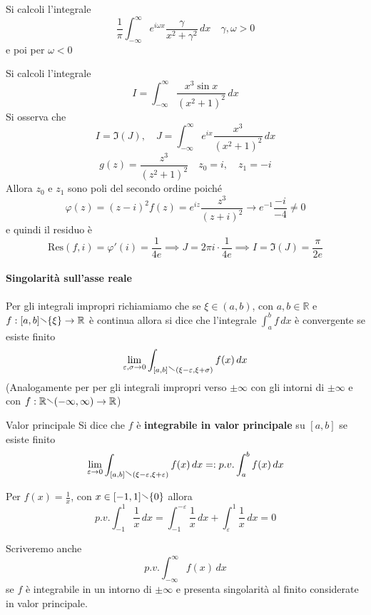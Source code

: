\begin{eser}
    Si calcoli l'integrale
    \[
      \frac{1}{\pi} \int_{-\infty}^{\infty} e^{i\omega x} \frac{\gamma}{x^2 +
      \gamma^2} \,dx \quad \gamma, \omega > 0 
    \]
    e poi per \(\omega < 0\) 
\end{eser}

\begin{eser}
    Si calcoli l'integrale
    \[
      I = \int_{-\infty}^{\infty} \frac{x^3\sin x}{{(x^2 + 1)}^2} \,dx 
    \]
    Si osserva che
    \[
        I = \Im {(J)}, \quad J = \int_{-\infty}^{\infty} e^{ix}
      \frac{x^3}{{(x^2+1)}^2} \,dx 
    \]
    \[
    g{(z)} = \frac{z^3}{{(z^2+1)}^2}\quad z_{0} = i, \quad z_{1} = -i
    \]
    Allora \(z_{0}\) e \(z_{1}\) sono poli del secondo ordine poiché
    \[
        \varphi {(z)} = {(z-i)}^2 f{(z)} = e^{iz} \frac{z^3}{{(z+i)}^2} \to
        e^{-1}\frac{-i}{-4}\neq 0
    \]
    e quindi il residuo è
    \[
      \mathrm{Res}{(f,i)} = \varphi '{(i)} = \frac{1}{4e} \implies J = 2\pi i
      \cdot \frac{1}{4e} \implies I = \Im(J) = \frac{\pi}{2e}
    \]
\end{eser}

\paragraph{Singolarità sull'asse reale} 
Per gli integrali impropri richiamiamo che se \(\xi \in {(a, b)}\), con \(a, b
\in \mathbb{R}\) e \(f : [a, b] \sminus \{\xi\} \to \mathbb{R}\) è continua
allora si dice che l'integrale \(\int_{a}^{b} f \,dx \) è convergente se esiste
finito
\[
    \lim_{\varepsilon, \sigma \to 0} \int _{[a, b] \sminus {(\xi - \varepsilon,
    \xi + \sigma)}} f{(x)} \,dx
\]
(Analogamente per per gli integrali impropri verso \(\pm \infty\) con gli intorni
di \(\pm \infty\) e con \(f : \mathbb{R} \sminus {(-\infty, \infty)} \to
\mathbb{R}\))

\begin{definition}{Valor principale}
    Si dice che \(f\) è \textbf{integrabile in valor principale} su \([a,b]\) se
    esiste finito
    \[
        \lim_{\varepsilon \to 0} \int _{[a,b] \sminus {(\xi - \varepsilon,
        \xi+\varepsilon)}} f{(x)} \,dx =: p.v. \int_{a}^{b} f{(x)} \,dx
    \]
\end{definition}
\begin{example}
    Per \(f{(x)} = \frac{1}{x}\), con \(x \in [-1, 1] \sminus \{0\} \) allora
    \[
      p.v. \int_{-1}^{1} \frac{1}{x} \,d x = \int_{-1}^{-\varepsilon}
      \frac{1}{x} \,dx + \int_{\varepsilon}^{1} \frac{1}{x} \,dx = 0 
    \]
\end{example}
Scriveremo anche
\[
  p.v. \int_{-\infty}^{\infty} f{(x)} \,dx 
\] se \(f\) è integrabile in un intorno di \(\pm \infty\) e presenta singolarità
al finito considerate in valor principale.

